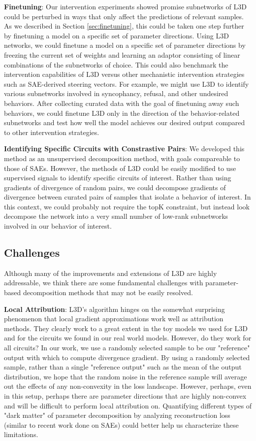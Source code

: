 \documentclass{article}
\theoremstyle{plain}
\theoremstyle{definition}
\theoremstyle{remark}
\begin{document}
\textbf{Finetuning}: Our intervention experiments showed promise subnetworks of L3D could be perturbed in ways that only affect the predictions of relevant samples. As we described in Section \ref{sec:finetuning}, this could be taken one step further by finetuning a model on a specific set of parameter directions. Using L3D networks, we could finetune a model on a specific set of parameter directions by freezing the current set of weights and learning an adaptor consisting of linear combinations of the subnetworks of choice. This could also benchmark the intervention capabilities of L3D versus other mechanistic intervention strategies such as SAE-derived steering vectors. For example, we might use L3D to identify various subnetworks involved in syncophancy, refusal, and other undesired behaviors. After collecting curated data with the goal of finetuning away such behaviors, we could finetune L3D only in the direction of the behavior-related subnetworks and test how well the model achieves our desired output compared to other intervention strategies. 

\textbf{Identifying Specific Circuits with Constrastive Pairs}:
We developed this method as an unsupervised decomposition method, with goals compareable to those of SAEs. However, the methods of L3D could be easily modified to use supervised signals to identify specific circuits of interest. Rather than using gradients of divergence of random pairs, we could decompose gradients of divergence between curated pairs of samples that isolate a behavior of interest. In this context, we could probably not require the topK constraint, but instead look decompose the network into a very small number of low-rank subnetworks involved in our behavior of interest. 

\subsection{Challenges}
Although many of the improvements and extensions of L3D are highly addressable, we think there are some fundamental challenges with parameter-based decomposition methods that may not be easily resolved.


\textbf{Local Attribution}: L3D's algorithm hinges on the somewhat surprising phenomenon that local gradient approximations work well as attribution methods. They clearly work to a great extent in the toy models we used for L3D and for the circuits we found in our real world models. However, do they work for all circuits? In our work, we use a randomly selected sample to be our "reference" output with which to compute divergence gradient. By using a randomly selected sample, rather than a single "reference output" such as the mean of the output distribution, we hope that the random noise in the reference sample will average out the effects of any non-convexity in the loss landscape.  However, perhaps, even in this setup, perhaps there are parameter directions that are highly non-convex and will be difficult to perform local attribution on. Quantifying different types of "dark matter" of parameter decomposition by analyzing reconstruction loss (similar to recent work done on SAEs) could better help us characterize these limitations.
\end{document}
